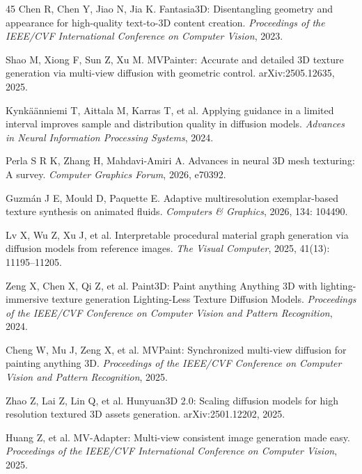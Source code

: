 \documentclass[times,twocolumn,final]{elsarticle}
\providecommand{\DIFadd}[1]{{\protect\color{blue} \sf #1}} %
\providecommand{\DIFdel}[1]{{\protect\color{red} \scriptsize #1}} %
\providecommand{\DIFaddbegin}{} %
\providecommand{\DIFaddend}{} %
\providecommand{\DIFdelbegin}{} %
\providecommand{\DIFdelend}{} %
\begin{document}
\begin{thebibliography}{45}
Chen R, Chen Y, Jiao N, Jia K. Fantasia3D: Disentangling geometry and appearance for high-quality text-to-3D content creation. \textit{Proceedings of the IEEE/CVF International Conference on Computer Vision}, 2023.

Shao M, Xiong F, Sun Z, Xu M. MVPainter: Accurate and detailed 3D texture generation via multi-view diffusion with geometric control. arXiv:2505.12635, 2025.

Kynk\"a\"anniemi T, Aittala M, Karras T, et al. Applying guidance in a limited interval improves sample and distribution quality in diffusion models. \textit{Advances in Neural Information Processing Systems}, 2024.

Perla S R K, Zhang H, Mahdavi-Amiri A. Advances in neural 3D mesh texturing: A survey. \textit{Computer Graphics Forum}, 2026, e70392.

Guzm\'an J E, Mould D, Paquette E. Adaptive multiresolution exemplar-based texture synthesis on animated fluids. \textit{Computers \& Graphics}, 2026, 134: 104490.

Lv X, Wu Z, Xu J, et al. Interpretable procedural material graph generation via diffusion models from reference images. \textit{The Visual Computer}, 2025, 41(13): 11195--11205.

Zeng X, Chen X, Qi Z, et al. Paint3D: Paint \DIFdelbegin \DIFdel{anything }\DIFdelend \DIFaddbegin \DIFadd{Anything }\DIFaddend 3D with \DIFdelbegin \DIFdel{lighting-immersive texture generation}\DIFdelend \DIFaddbegin \DIFadd{Lighting-Less Texture Diffusion Models}\DIFaddend . \textit{Proceedings of the IEEE/CVF Conference on Computer Vision and Pattern Recognition}, 2024.

Cheng W, Mu J, Zeng X, et al. MVPaint: Synchronized multi-view diffusion for painting anything 3D. \textit{Proceedings of the IEEE/CVF Conference on Computer Vision and Pattern Recognition}, 2025.

Zhao Z, Lai Z, Lin Q, et al. Hunyuan3D 2.0: Scaling diffusion models for high resolution textured 3D assets generation. arXiv:2501.12202, 2025.

Huang Z, et al. MV-Adapter: Multi-view consistent image generation made easy. \textit{Proceedings of the IEEE/CVF International Conference on Computer Vision}, 2025.


\end{thebibliography}
\end{document}
